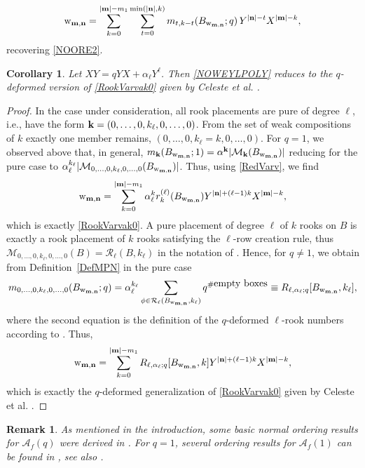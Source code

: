 \documentclass[10pt]{amsart}
\newtheorem{corollary}[theorem]{Corollary}
\newtheorem{remark}[theorem]{Remark}%
\begin{document}
$$
\mathrm{w}_{{\bf m}, {\bf n}}=\sum_{k=0}^{|{\bf m}|-m_1} \sum_{t=0}^{\min(|{\bf n}|,k)} m_{t,k-t}(B_{\mathrm{w}_{{\bf m}, {\bf n}}};q) \, Y^{|{\bf n}|-t} X^{|{\bf m}|- k},
$$ 
recovering \eqref{NOORE2}.
\begin{corollary} Let $XY=qYX+\alpha_{\ell}Y^{\ell}$. Then \eqref{NOWEYLPOLY} reduces to the $q$-deformed version of \eqref{RookVarvak0} given by Celeste et al. \cite{CCG2017}.
\end{corollary}
\begin{proof}
In the case under consideration, all rook placements are pure of degree $\ell$, i.e., have the form ${\bf k} =(0,\ldots,0,k_{\ell},0,\ldots,0)$. From the set of weak compositions of $k$ exactly one member remains, $(0,\ldots,0,k_{\ell}=k,0,\ldots,0)$. For $q=1$, we observed above that, in general, $m_{{\bf k}}(B_{\mathrm{w}_{{\bf m}, {\bf n}}};1)={\bf  \alpha}^{{\bf k}}|{\mathcal M}_{{\bf k}}(B_{\mathrm{w}_{{\bf m}, {\bf n}}})|$ reducing for the  pure case to $\alpha_{\ell}^{k_{\ell}}|{\mathcal M}_{0,\ldots,0,k_{\ell},0,\ldots,0}(B_{\mathrm{w}_{{\bf m}, {\bf n}}})|$. Thus, using \eqref{RedVarv}, we find
$$
\mathrm{w}_{{\bf m}, {\bf n}}=\sum_{k=0}^{|{\bf m}|-m_1} \alpha_{\ell}^{k} r_{k}^{(\ell)}(B_{\mathrm{w}_{{\bf m}, {\bf n}}}) Y^{|{\bf n}|+(\ell-1)k} X^{|{\bf m}|- k},
$$
which is exactly \eqref{RookVarvak0}. 
A pure placement of degree $\ell$ of $k$ rooks on $B$ is exactly a rook placement of $k$ rooks satisfying the $\ell$-row creation rule, thus ${\mathcal M}_{0,\ldots,0,k_{\ell},0,\ldots,0}(B)={\mathcal R}_{\ell}(B,k_{\ell})$ in the notation of \cite{CCG2017}. Hence, for $q\neq 1$, we obtain from Definition~\ref{DefMPN} in the pure case 
\begin{equation}\label{RedPure}
m_{0,\ldots,0,k_{\ell},0,\ldots,0}(B_{\mathrm{w}_{{\bf m}, {\bf n}}};q)= \alpha_{\ell}^{k_{\ell}} \sum_{\phi \in {\mathcal R}_{\ell}(B_{\mathrm{w}_{{\bf m}, {\bf n}}},k_{\ell})} q^{\# \mbox{empty boxes}}\equiv R_{\ell, \alpha_{\ell};q}[B_{\mathrm{w}_{{\bf m}, {\bf n}}},k_{\ell}],
\end{equation}
where the second equation is the definition of the $q$-deformed $\ell$-rook numbers according to \cite{CCG2017}. Thus, 
$$
\mathrm{w}_{{\bf m}, {\bf n}}=\sum_{k=0}^{|{\bf m}|-m_1} R_{\ell, \alpha_{\ell};q}[B_{\mathrm{w}_{{\bf m}, {\bf n}}},k] Y^{|{\bf n}|+(\ell-1)k} X^{|{\bf m}|- k},
$$ 
which is exactly the $q$-deformed generalization of \eqref{RookVarvak0} given by Celeste et al. \cite{CCG2017}.
\end{proof}
\begin{remark}
As mentioned in the introduction, some basic normal ordering results for ${\mathcal A}_f(q)$ were derived in \cite{TMMS2011}. For $q=1$, several ordering results for ${\mathcal A}_f(1)$ can be found in \cite{BLO2013,BLO2015,BLO2015a}, see also \cite{BRLO2020,Lopes2024}.
\end{remark}
\end{document}
